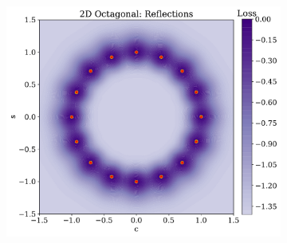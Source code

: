 \begin{figure}
\begin{subfigure}[b]{0.28\textwidth}
        \caption{}
        \label{fig:otherdistributions_2D_ii}
    \end{subfigure}
    \hfill
    \begin{subfigure}[b]{0.27\textwidth}
        \centering
        \includegraphics[height=\textwidth]{figures/chapter-09/2doctagonalreflections.pdf}
        \caption{}
        \label{fig:otherdistributions_2D_iii}
    \end{subfigure}
    
    \vspace{0.3cm}
    

\end{figure}
